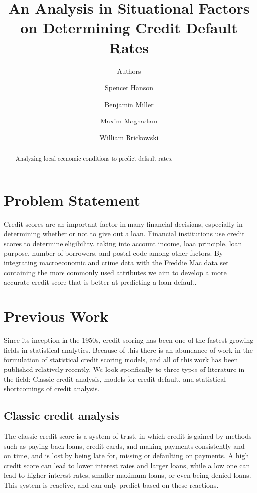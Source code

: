 \documentclass[sigconf, 11pt]{acmart}
\begin{document}
\title{An Analysis in Situational Factors on Determining Credit Default Rates}
\subtitle{Authors}

\author{Spencer Hanson}
\affiliation{}

\author{Benjamin Miller}
\affiliation{}

\author{Maxim Moghadam}
\affiliation{}

\author{William Brickowski}
\affiliation{}

\begin{abstract}
Analyzing local economic conditions to predict default rates.
\end{abstract}

\maketitle



\section{Problem Statement}
Credit scores are an important factor in many financial decisions, especially in determining whether or not to give out a loan. Financial institutions use credit scores to determine eligibility, taking into account income, loan principle, loan purpose, number of borrowers, and postal code among other factors. By integrating macroeconomic and crime data with the Freddie Mac data set containing the more commonly used attributes we aim to develop a more accurate credit score that is better at predicting a loan default.

\section{Previous Work}
Since its inception in the 1950s, credit scoring has been one of the fastest growing fields	 in statistical analytics. Because of this there is an abundance of work in the formulation of statistical credit scoring models, and all of this work has been published relatively recently. We look specifically to three types of literature in the field: Classic credit analysis, models for credit default, and statistical shortcomings of credit analysis.

\subsection{Classic credit analysis}
The classic credit score is a system of trust, in which credit is gained by methods such as paying back loans, credit cards, and making payments consistently and on time, and is lost by being late for, missing or defaulting on payments. A high credit score can lead to lower interest rates and larger loans, while a low one can lead to higher interest rates, smaller maximum loans, or even being denied loans. This system is reactive, and can only predict based on these reactions.
\end{document}
